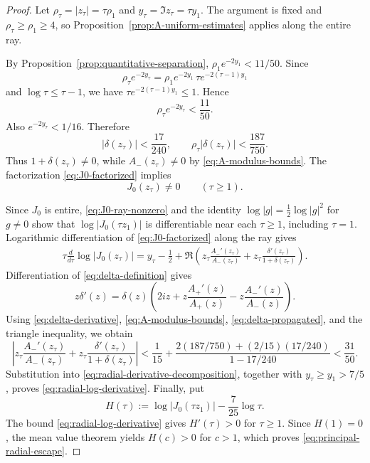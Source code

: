\documentclass[11pt]{amsart}
\numberwithin{equation}{section}
\theoremstyle{definition}
\theoremstyle{remark}
\begin{document}
\begin{proof}
Let $\rho_\tau=|z_\tau|=\tau\rho_1$ and
$y_\tau=\Im z_\tau=\tau y_1$.  The argument is fixed and
$\rho_\tau\ge\rho_1\ge4$, so Proposition~\ref{prop:A-uniform-estimates}
applies along the entire ray.

By Proposition~\ref{prop:quantitative-separation},
$\rho_1e^{-2y_1}<11/50$.  Since
\[
   \rho_\tau e^{-2y_\tau}
   =\rho_1e^{-2y_1}\,\tau e^{-2(\tau-1)y_1}
\]
and $\log\tau\le\tau-1$, we have
$\tau e^{-2(\tau-1)y_1}\le1$.  Hence
\begin{equation*}
   \rho_\tau e^{-2y_\tau}<\frac{11}{50}.
\end{equation*}
Also $e^{-2y_\tau}<1/16$.  Therefore
\begin{equation}\label{eq:delta-propagated}
   |\delta(z_\tau)|<\frac{17}{240},
   \qquad
   \rho_\tau|\delta(z_\tau)|<\frac{187}{750}.
\end{equation}
Thus $1+\delta(z_\tau)\ne0$, while
$A_-(z_\tau)\ne0$ by \eqref{eq:A-modulus-bounds}.  The factorization
\eqref{eq:J0-factorized} implies
\begin{equation}\label{eq:J0-ray-nonzero}
   J_0(z_\tau)\ne0\qquad(\tau\ge1).
\end{equation}

Since $J_0$ is entire, \eqref{eq:J0-ray-nonzero} and the identity
$\log|g|=\tfrac12\log|g|^2$ for $g\ne0$ show that $\log|J_0(\tau z_1)|$ is
differentiable near each $\tau\ge1$, including $\tau=1$.
Logarithmic differentiation of \eqref{eq:J0-factorized} along the ray gives
\begin{equation}\label{eq:radial-derivative-decomposition}
\begin{aligned}
   \tau\frac{d}{d\tau}\log|J_0(z_\tau)|
   =y_\tau-\frac12 +\Re\left(
   z_\tau\frac{A_-'(z_\tau)}{A_-(z_\tau)}
   +z_\tau\frac{\delta'(z_\tau)}{1+\delta(z_\tau)}
   \right).
\end{aligned}
\end{equation}
Differentiation of \eqref{eq:delta-definition} gives
\begin{equation}\label{eq:delta-derivative}
   z\delta'(z)=\delta(z)\left(
   2iz+z\frac{A_+'(z)}{A_+(z)}
   -z\frac{A_-'(z)}{A_-(z)}
   \right).
\end{equation}
Using \eqref{eq:delta-derivative}, \eqref{eq:A-modulus-bounds},
\eqref{eq:delta-propagated}, and the triangle inequality, we obtain
\[
   \left|z_\tau\frac{A_-'(z_\tau)}{A_-(z_\tau)}
   +z_\tau\frac{\delta'(z_\tau)}{1+\delta(z_\tau)}\right|
   <\frac1{15}
   +\frac{2(187/750)+(2/15)(17/240)}{1-17/240}
   <\frac{31}{50}.
\]
Substitution into \eqref{eq:radial-derivative-decomposition}, together with
$y_\tau\ge y_1>7/5$, proves \eqref{eq:radial-log-derivative}.
Finally, put
\[
   H(\tau):=\log|J_0(\tau z_1)|-\frac7{25}\log\tau.
\]
The bound \eqref{eq:radial-log-derivative} gives $H'(\tau)>0$ for
$\tau\ge1$.  Since $H(1)=0$, the mean value theorem yields $H(c)>0$ for
$c>1$, which proves \eqref{eq:principal-radial-escape}.
\end{proof}
\end{document}
